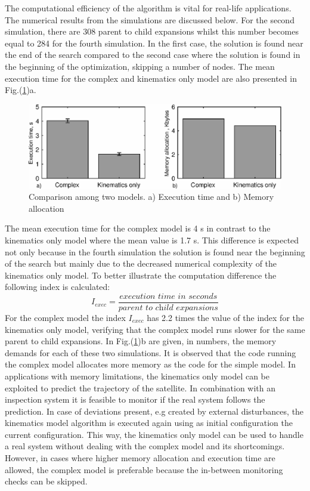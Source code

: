 \documentclass[journal]{new-aiaa}
\begin{document}
The computational efficiency of the algorithm is vital for real-life applications. The numerical results from the simulations are discussed below.
For the second simulation, there are 308 parent to child expansions whilst this number becomes equal to 284 for the fourth simulation. In the first case, the solution is found near the end of the search compared to the second case where the solution is found in the beginning of the optimization, skipping a number of nodes. The mean execution time for the complex and kinematics only model are also presented in Fig.(\ref{fig:timememory})a. 
\begin{figure}[H]
\centering
\includegraphics[width=6in]{timememorytest.eps}
\caption{Comparison among two models. a) Execution time and b) Memory allocation}
\label{fig:timememory}
\end{figure}
The mean execution time for the complex model is 4 s in contrast to the kinematics only model where the mean value is 1.7 s. This difference is expected not only because in the fourth simulation the solution is found near the beginning of the search but mainly due to the decreased numerical complexity of the kinematics only model. To better illustrate the computation difference the following index is calculated:
\begin{equation}
    \label{eq:i_exec}
    I_{exec}=\frac{ \textit{execution time in seconds}}{\textit{parent to child expansions}}
\end{equation}
For the complex model the index $I_{exec}$ has 2.2 times the value of the index for the kinematics only model, verifying that the complex model runs slower for the same parent to child expansions. In Fig.(\ref{fig:timememory})b are given, in numbers, the memory demands for each of these two simulations. 
It is observed that the code running the complex model allocates more memory as the code for the simple model. In applications with memory limitations, the kinematics only model can be exploited to predict the trajectory of the satellite. In combination with an inspection system it is feasible to monitor if the real system follows the prediction. In case of deviations present, e.g created by external disturbances, the kinematics model algorithm is executed again using as initial configuration the current configuration. This way, the kinematics only model can be used to handle a real system without dealing with the complex model and its shortcomings. However, in cases where higher memory allocation and execution time are allowed, the complex model is preferable because the in-between monitoring checks can be skipped.
\end{document}
